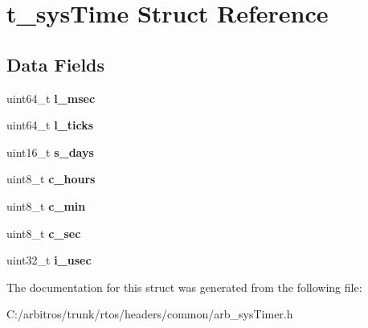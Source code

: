 \hypertarget{structt__sys_time}{\section{t\-\_\-sys\-Time Struct Reference}
\label{structt__sys_time}
}
\subsection*{Data Fields}
\begin{DoxyCompactItemize}
\item 
\hypertarget{structt__sys_time_aa7ea091c1bec8d6de72922af1e6ee55d}{uint64\-\_\-t {\bfseries l\-\_\-msec}}\label{structt__sys_time_aa7ea091c1bec8d6de72922af1e6ee55d}

\item 
\hypertarget{structt__sys_time_aa5fff4475a6df2f38704502fe5ea75ac}{uint64\-\_\-t {\bfseries l\-\_\-ticks}}\label{structt__sys_time_aa5fff4475a6df2f38704502fe5ea75ac}

\item 
\hypertarget{structt__sys_time_a683fcd262a6e27ae6b406a16c83bc509}{uint16\-\_\-t {\bfseries s\-\_\-days}}\label{structt__sys_time_a683fcd262a6e27ae6b406a16c83bc509}

\item 
\hypertarget{structt__sys_time_a5089c979dae6bbf98c34ce5b1996de39}{uint8\-\_\-t {\bfseries c\-\_\-hours}}\label{structt__sys_time_a5089c979dae6bbf98c34ce5b1996de39}

\item 
\hypertarget{structt__sys_time_adf3fd163adb240e1cfe8c6d9415d1835}{uint8\-\_\-t {\bfseries c\-\_\-min}}\label{structt__sys_time_adf3fd163adb240e1cfe8c6d9415d1835}

\item 
\hypertarget{structt__sys_time_a804fcb2077b304de4aadfaf995e90184}{uint8\-\_\-t {\bfseries c\-\_\-sec}}\label{structt__sys_time_a804fcb2077b304de4aadfaf995e90184}

\item 
\hypertarget{structt__sys_time_af05f4cf0fa74529e7c846bff282f1cdb}{uint32\-\_\-t {\bfseries i\-\_\-usec}}\label{structt__sys_time_af05f4cf0fa74529e7c846bff282f1cdb}

\end{DoxyCompactItemize}


The documentation for this struct was generated from the following file\-:\begin{DoxyCompactItemize}
\item 
C\-:/arbitros/trunk/rtos/headers/common/arb\-\_\-sys\-Timer.\-h\end{DoxyCompactItemize}
